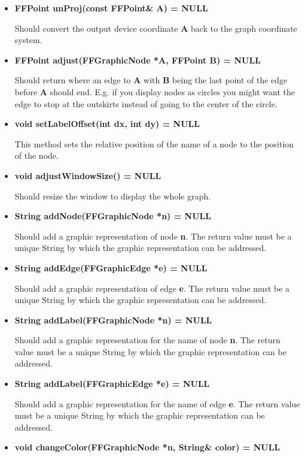 \begin{itemize}
\item{\bf FFPoint unProj(const FFPoint\& A) = NULL}
  
  Should convert the output device coordinate {\bf A} back to the
  graph coordinate system.

\item{\bf FFPoint adjust(FFGraphicNode *A, FFPoint B) = NULL}
  
  Should return where an edge to {\bf A} with {\bf B} being the
  last point of the edge before {\bf A} should end. E.g.  if you
  display nodes as circles you might want the edge to stop at the
  outskirts instead of going to the center of the circle.

\item{\bf void setLabelOffset(int dx, int dy) = NULL}
  
  This method sets the relative position of the name of a node to
  the position of the node.
            
\item{\bf void adjustWindowSize() = NULL}
  
  Should resize the window to display the whole graph.

\item{\bf String addNode(FFGraphicNode *n) = NULL}
  
  Should add a graphic representation of node {\bf n}. The return
  value must be a unique String by which the graphic
  representation can be addressed.

\item{\bf String addEdge(FFGraphicEdge *e) = NULL}
  
  Should add a graphic representation of edge {\bf e}. The return
  value must be a unique String by which the graphic
  representation can be addressed.

\item{\bf String addLabel(FFGraphicNode *n) = NULL}
  
  Should add a graphic representation for the name of node {\bf
    n}. The return value must be a unique String by which the
  graphic representation can be addressed.

\item{\bf String addLabel(FFGraphicEdge *e) = NULL}
  
  Should add a graphic representation for the name of edge {\bf
    e}. The return value must be a unique String by which the
  graphic representation can be addressed.
  
\item{\bf void changeColor(FFGraphicNode *n, String\& color) =
    NULL}
  

\end{itemize}
